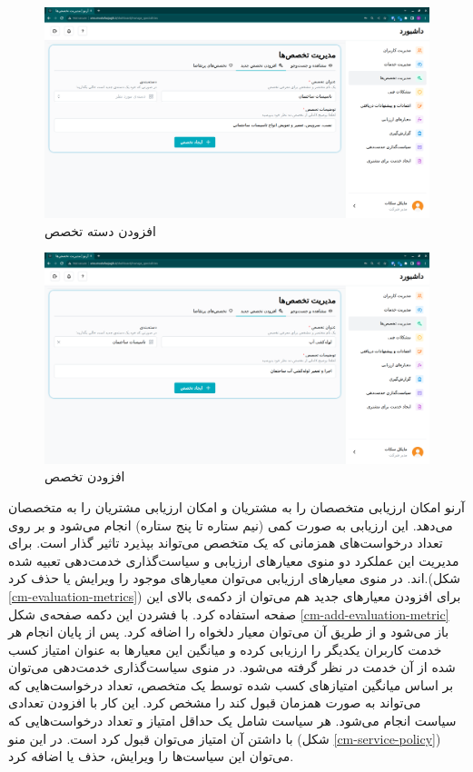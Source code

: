 \begin{figure}[h]
	\centering
	\includegraphics[width=\textwidth]{figs/user-guide/cm-add-category}
	\caption{افزودن دسته‌ تخصص}
	\label{cm-add-category}
\end{figure}

\begin{figure}[h]
	\centering
	\includegraphics[width=\textwidth]{figs/user-guide/cm-add-speciality}
	\caption{افزودن تخصص}
	\label{cm-add-speciality}
\end{figure}

\FloatBarrier

آرنو امکان ارزیابی متخصصان را به مشتریان و امکان ارزیابی مشتریان را به متخصصان می‌دهد.
این ارزیابی به صورت کمی (نیم ستاره تا پنج ستاره) انجام می‌شود و بر روی تعداد درخواست‌های همزمانی که یک متخصص می‌تواند بپذیرد تاثیر گذار است.
برای مدیریت این عملکرد دو منوی معیارهای ارزیابی و سیاست‌گذاری خدمت‌دهی تعبیه شده اند.
در منوی معیارهای ارزیابی می‌توان معیارهای موجود را ویرایش یا حذف کرد.(شکل \ref{cm-evaluation-metrics})
برای افزودن معیارهای جدید هم می‌توان از دکمه‌ی بالای این صفحه استفاده کرد.
با فشردن این دکمه صفحه‌ی شکل \ref{cm-add-evaluation-metric} باز می‌شود و از طریق آن می‌توان معیار دلخواه را اضافه کرد.
پس از پایان انجام هر خدمت کاربران یکدیگر را ارزیابی کرده و میانگین این معیارها به عنوان امتیاز کسب شده از آن خدمت در نظر گرفته می‌شود.
در منوی سیاست‌گذاری خدمت‌دهی می‌توان بر اساس میانگین امتیازهای کسب شده توسط یک متخصص، تعداد درخواست‌هایی که می‌تواند به صورت همزمان قبول کند را مشخص کرد.
این کار با افزودن تعدادی سیاست انجام می‌شود.
هر سیاست شامل یک حداقل امتیاز و تعداد درخواست‌هایی که با داشتن آن امتیاز می‌توان قبول کرد است.
در این منو (شکل \ref{cm-service-policy}) می‌توان این سیاست‌ها را ویرایش، حذف یا اضافه کرد.

